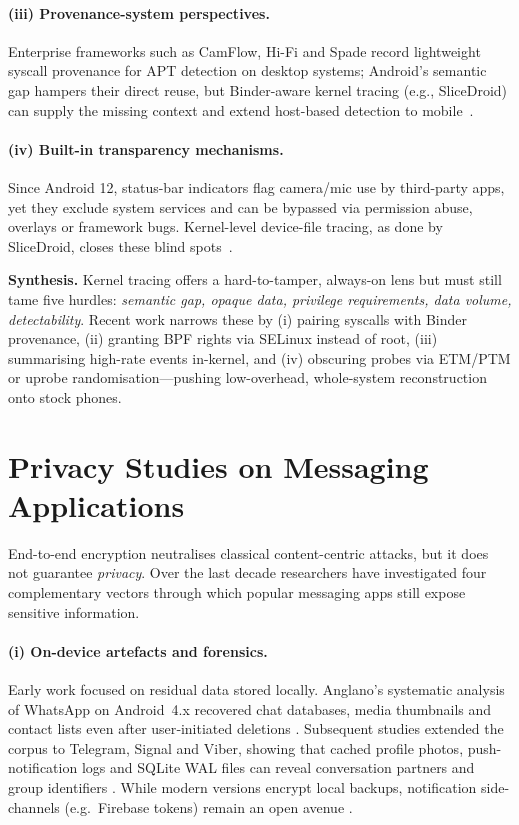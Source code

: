 \documentclass[a4paper,12pt]{report}
\begin{document}
\paragraph{(iii) Provenance-system perspectives.}
Enterprise frameworks such as CamFlow, Hi-Fi and Spade record lightweight syscall provenance for APT detection on desktop systems; Android’s semantic gap hampers their direct reuse, but Binder-aware kernel tracing (e.g., SliceDroid) can supply the missing context and extend host-based detection to mobile~\cite{placeholder_citation_3}.

\paragraph{(iv) Built-in transparency mechanisms.}

Since Android 12, status-bar indicators flag camera/mic use by third-party apps, yet they exclude system services and can be bypassed via permission abuse, overlays or framework bugs. Kernel-level device-file tracing, as done by SliceDroid, closes these blind spots~\cite{placeholder_citation_4}.

\medskip
\noindent\textbf{Synthesis.}
Kernel tracing offers a hard-to-tamper, always-on lens but must still tame five hurdles: \emph{semantic gap, opaque data, privilege requirements, data volume, detectability}.  Recent work narrows these by (i) pairing syscalls with Binder provenance, (ii) granting BPF rights via SELinux instead of root, (iii) summarising high-rate events in-kernel, and (iv) obscuring probes via ETM/PTM or uprobe randomisation—pushing low-overhead, whole-system reconstruction onto stock phones.

\section{Privacy Studies on Messaging Applications}
\label{sec:rw:privacy-im}

End-to-end encryption neutralises classical content-centric attacks, but it
does not guarantee \emph{privacy}.  Over the last decade researchers have
investigated four complementary vectors through which popular messaging
apps still expose sensitive information.

\paragraph{(i) On-device artefacts and forensics.}
Early work focused on residual data stored locally.
Anglano’s systematic analysis of WhatsApp on Android~4.x recovered chat
databases, media thumbnails and contact lists even after user‐initiated
deletions \cite{anglano2015whatsapp}.
Subsequent studies extended the corpus to Telegram, Signal and Viber,
showing that cached profile photos, push-notification logs and SQLite WAL
files can reveal conversation partners and group identifiers
\cite{moltchanov2018telegram, obermeier2018signal}.
While modern versions encrypt local backups, notification side-channels
(e.g.\ Firebase tokens) remain an open avenue \cite{berezowski2020push}.
\end{document}
